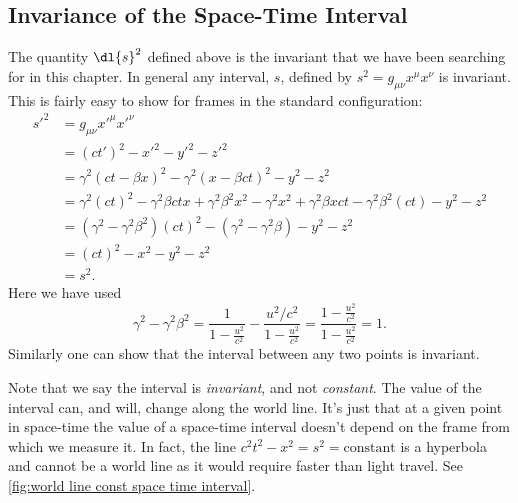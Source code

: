\documentclass[fleqn]{NotesClass}
\begin{document}
    \subsection{Invariance of the Space-Time Interval}
    The quantity \(\dl{s}^2\) defined above is the invariant that we have been searching for in this chapter.
    In general any interval, \(s\), defined by \(s^2 = g_{\mu \nu}x^\mu x^\nu\) is invariant.
    This is fairly easy to show for frames in the standard configuration:
    \begin{align}
        s'^2 &= g_{\mu\nu}x'^\mu x'^\nu\\
        &= (ct')^2 - x'^2 - y'^2 - z'^2\\
        &= \gamma^2(ct - \beta x)^2 - \gamma^2(x - \beta ct)^2 - y^2 - z^2\\
        &= \gamma^2(ct)^2 - \gamma^2\beta ctx + \gamma^2\beta^2 x^2 - \gamma^2 x^2 + \gamma^2\beta xct - \gamma^2\beta^2(ct) - y^2 - z^2\\
        &= (\gamma^2 - \gamma^2\beta^2)(ct)^2 - (\gamma^2 - \gamma^2\beta) - y^2 - z^2\\
        &= (ct)^2 - x^2 - y^2 - z^2\\
        &= s^2.
    \end{align}
    Here we have used
    \begin{equation}
        \gamma^2 - \gamma^2\beta^2 = \frac{1}{1 - \frac{u^2}{c^2}} - \frac{u^2/c^2}{1 - \frac{u^2}{c^2}} = \frac{1 - \frac{u^2}{c^2}}{1 - \frac{u^2}{c^2}} = 1.
    \end{equation}
    Similarly one can show that the interval between any two points is invariant.
    
    Note that we say the interval is \emph{invariant}, and not \emph{constant}.
    The value of the interval can, and will, change along the world line.
    It's just that at a given point in space-time the value of a space-time interval doesn't depend on the frame from which we measure it.
    In fact, the line \(c^2t^2 - x^2 = s^2 = \text{constant}\) is a hyperbola and cannot be a world line as it would require faster than light travel.
    See \cref{fig:world line const space time interval}.
    
\end{document}
